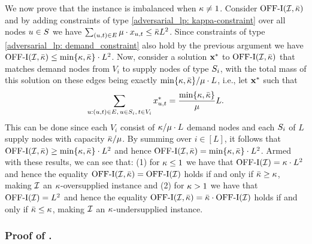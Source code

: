We now prove that the instance is imbalanced when $\kappa \not= 1$. Consider $\mathrm{\mathrm{OFF}}\textrm{-}\mathrm{I}(\mathcal I, \bar{\kappa})$ and by adding constraints of type \eqref{adversarial_lp: kappa-constraint} over all nodes $u \in S$ we have $\sum_{(u,t) \in E} \mu \cdot x_{u,t} \leq \bar{\kappa} L^2$. Since constraints of type \eqref{adversarial_lp: demand_constraint} also hold by the previous argument we have $\mathrm{\mathrm{OFF}}\textrm{-}\mathrm{I}(\mathcal I, \bar{\kappa}) \leq \min \{\kappa, \bar{\kappa} \} \cdot L^2$. Now, consider a solution $\mathbf{x}^*$ to $\mathrm{\mathrm{OFF}}\textrm{-}\mathrm{I}(\mathcal I, \bar{\kappa})$ that matches demand nodes from $V_i$ to supply nodes of type $S_i$, with the total mass of this solution on these edges being exactly $\min \{\kappa, \bar{\kappa} \}/\mu \cdot L$, i.e., let $\mathbf{x}^*$ such that
\begin{equation*}
    \sum_{u: (u,t) \in E,\, u \in S_i, \, t \in V_i} x^*_{u,t} = \frac{\min \{\kappa, \bar{\kappa} \}}{\mu} L.
\end{equation*}
This can be done since each $V_i$ consist of $\kappa/\mu \cdot L$ demand nodes and each $S_i$ of $L$ supply nodes with capacity $\bar{\kappa}/\mu$. By summing over $i \in [L]$, it follows that $\mathrm{\mathrm{OFF}}\textrm{-}\mathrm{I}(\mathcal I, \bar{\kappa}) \geq \min \{\kappa, \bar{\kappa} \} \cdot L^2$ and hence $\mathrm{\mathrm{OFF}}\textrm{-}\mathrm{I}(\mathcal I, \bar{\kappa}) = \min \{\kappa, \bar{\kappa} \} \cdot L^2$. Armed with these results, we can see that: (1) for $\kappa \leq 1$ we have that $\mathrm{\mathrm{OFF}}\textrm{-}\mathrm{I}(\mathcal I) = \kappa \cdot L^2 $ and hence the equality $\mathrm{\mathrm{OFF}}\textrm{-}\mathrm{I}(\mathcal I, \bar{\kappa}) = \mathrm{\mathrm{OFF}}\textrm{-}\mathrm{I}(\mathcal I)$ holds if and only if $\bar{\kappa} \geq \kappa$, making $\mathcal I$ an $\kappa$-oversupplied instance and (2) for $\kappa > 1$ we have that $\mathrm{\mathrm{OFF}}\textrm{-}\mathrm{I}(\mathcal I) = L^2$ and hence the equality $\mathrm{\mathrm{OFF}}\textrm{-}\mathrm{I}(\mathcal I, \bar{\kappa}) = \bar{\kappa} \cdot \mathrm{\mathrm{OFF}}\textrm{-}\mathrm{I}(\mathcal I)$ holds if and only if $\bar{\kappa} \leq \kappa$, making $\mathcal I$ an $\kappa$-undersupplied instance.
\hfill\Halmos %

\subsubsection[]{Proof of .}
\label{proof: AdvCRLimit}


